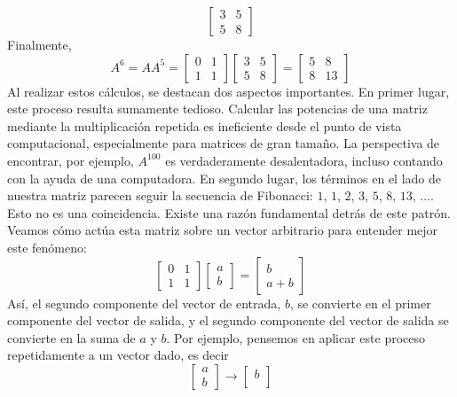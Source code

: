 \begin{example}
$$\begin{bmatrix}
        3 & 5 \\
        5 & 8
    \end{bmatrix}$$
    Finalmente,
    $$A^6 = AA^5 = \begin{bmatrix}
        0 & 1 \\
        1 & 1
    \end{bmatrix}\begin{bmatrix}
        3 & 5 \\
        5 & 8
    \end{bmatrix} = \begin{bmatrix}
        5 & 8 \\
        8 & 13
    \end{bmatrix}$$\newpage\noindent
    Al realizar estos cálculos, se destacan dos aspectos importantes. En primer lugar, este proceso resulta sumamente tedioso. Calcular las potencias de una matriz mediante la multiplicación repetida es ineficiente desde el punto de vista computacional, especialmente para matrices de gran tamaño. La perspectiva de encontrar, por ejemplo, $A^{100}$ es verdaderamente desalentadora, incluso contando con la ayuda de una computadora. En segundo lugar, los términos en el lado de nuestra matriz parecen seguir la secuencia de Fibonacci: $1$, $1$, $2$, $3$, $5$, $8$, $13$, $\dots$. Esto no es una coincidencia. Existe una razón fundamental detrás de este patrón. Veamos cómo actúa esta matriz sobre un vector arbitrario para entender mejor este fenómeno:
    $$\begin{bmatrix}
        0 & 1 \\
        1 & 1
    \end{bmatrix} \begin{bmatrix}
        a \\
        b
    \end{bmatrix} = \begin{bmatrix}
        b \\
        a + b
    \end{bmatrix}$$
    Así, el segundo componente del vector de entrada, $b$, se convierte en el primer componente del vector de salida, y el segundo componente del vector de salida se convierte en la suma de $a$ y $b$. Por ejemplo, pensemos en aplicar este proceso repetidamente a un vector dado, es decir
    $$\begin{bmatrix}
        a \\
        b
    \end{bmatrix} \to \begin{bmatrix}
        b \\

\end{bmatrix}$$
\end{example}
